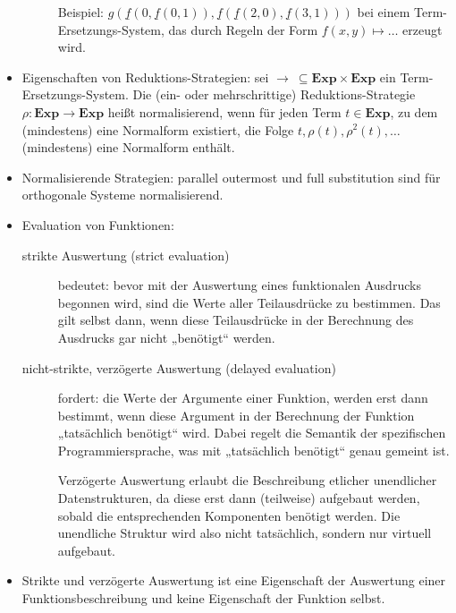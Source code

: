\documentclass[
  a4paper,
  11pt,
]{scrartcl}
\begin{document}
\begin{itemize}
\begin{description}
        Beispiel: $g(\underline{f}(0, \underline{f}(0, 1)),
        \underline{f}(\underline{f}(2, 0), \underline{f}(3,1)))$ bei einem
        Term-Ersetzungs-System, das durch Regeln der Form $f(x,y) \mapsto \dots$
        erzeugt wird.
    \end{description}

  \item Eigenschaften von Reduktions-Strategien: sei $\rightarrow \ \subseteq
    \textbf{Exp} \times \textbf{Exp}$ ein Term-Ersetzungs-System. Die (ein- oder
    mehrschrittige) Reduktions-Strategie $\rho: \textbf{Exp} \rightarrow
    \textbf{Exp}$ heißt normalisierend, wenn für jeden Term $t \in
    \textbf{Exp}$, zu dem (mindestens) eine Normalform existiert, die Folge $t,
    \rho(t), \rho^2(t), \dots$ (mindestens) eine Normalform enthält.

  \item Normalisierende Strategien: parallel outermost und full substitution
    sind für orthogonale Systeme normalisierend.

  \item Evaluation von Funktionen:
    \begin{description}
      \item[strikte Auswertung (strict evaluation)] bedeutet: bevor mit der
        Auswertung eines funktionalen Ausdrucks begonnen wird, sind die Werte
        aller Teilausdrücke zu bestimmen. Das gilt selbst dann, wenn diese
        Teilausdrücke in der Berechnung des Ausdrucks gar nicht „benötigt“
        werden.

      \item[nicht-strikte, verzögerte Auswertung (delayed evaluation)] fordert:
        die Werte der Argumente einer Funktion, werden erst dann bestimmt, wenn
        diese Argument in der Berechnung der Funktion „tatsächlich benötigt“
        wird. Dabei regelt die Semantik der spezifischen Programmiersprache, was
        mit „tatsächlich benötigt“ genau gemeint ist.

        Verzögerte Auswertung erlaubt die Beschreibung etlicher unendlicher
        Datenstrukturen, da diese erst dann (teilweise) aufgebaut werden, sobald
        die entsprechenden Komponenten benötigt werden. Die unendliche Struktur
        wird also nicht tatsächlich, sondern nur virtuell aufgebaut.
    \end{description}

  \item Strikte und verzögerte Auswertung ist eine Eigenschaft der Auswertung
    einer Funktionsbeschreibung und keine Eigenschaft der Funktion selbst.
\end{itemize}
\end{document}
